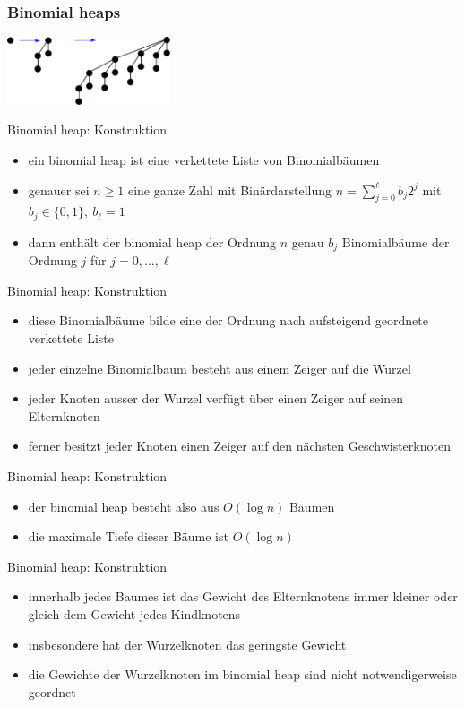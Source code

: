 \documentclass[aspectratio=1610, 11pt]{beamer}
\newcommand{\mytitle}{Binomial heaps}
\begin{document}
\begin{frame}\frametitle{\mytitle}
	\hfill\includegraphics[height=20mm]{images/binheap.pdf}
	\begin{overprint}
		\begin{exampleblock}{Binomial heap: Konstruktion}
			\begin{itemize}
				\item ein binomial heap ist eine verkettete Liste von Binomialb\"aumen 
				\item genauer sei $n\ge1$ eine ganze Zahl mit Bin\"ardarstellung $n=\sum_{j=0}^\ell b_j2^j$ mit $b_j\in\{0,1\},\ b_\ell=1$
				\item dann enth\"alt der binomial heap der Ordnung $n$ genau $b_j$ Binomialb\"aume der Ordnung $j$ f\"ur $j=0,\ldots,\ell$
			\end{itemize}
		\end{exampleblock}
		\begin{exampleblock}{Binomial heap: Konstruktion}
			\begin{itemize}
				\item diese Binomialb\"aume bilde eine der Ordnung nach aufsteigend geordnete verkettete Liste
				\item jeder einzelne Binomialbaum besteht aus einem Zeiger auf die Wurzel 
				\item jeder Knoten ausser der Wurzel verf\"ugt \"uber einen Zeiger auf seinen Elternknoten
				\item ferner besitzt jeder Knoten einen Zeiger auf den n\"achsten Geschwisterknoten
			\end{itemize}
		\end{exampleblock}
		\begin{exampleblock}{Binomial heap: Konstruktion}
			\begin{itemize}
				\item der binomial heap besteht also aus $O(\log n)$ B\"aumen
				\item die maximale Tiefe dieser B\"aume ist $O(\log n)$
			\end{itemize}
		\end{exampleblock}
		\begin{exampleblock}{Binomial heap: Konstruktion}
			\begin{itemize}
				\item innerhalb jedes Baumes ist das Gewicht des Elternknotens immer kleiner oder gleich dem Gewicht jedes Kindknotens
				\item insbesondere hat der Wurzelknoten das geringste Gewicht
				\item die Gewichte der Wurzelknoten im binomial heap sind nicht notwendigerweise geordnet
			\end{itemize}
		\end{exampleblock}
	\end{overprint}
\end{frame}
\end{document}
